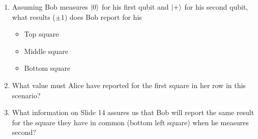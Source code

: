 \documentclass[12pt]{article}
\begin{document}
\begin{enumerate}[font=\bfseries]
    \item {} Assuming Bob measures $\ket{0}$ for his first qubit and $\ket{+}$ for his second qubit, what results ($\pm 1$) does Bob report for his
    \begin{itemize}
        \item Top square 
        \item Middle square 
        \item Bottom square 
    \end{itemize}
    \item {} What value must Alice have reported for the first square in her row in this scenario? 
    \item {} What information on Slide 14 assures us that Bob will report the same result for the square they have in common (bottom left square) when he measures second?
    
    
\end{enumerate}
\end{document}
